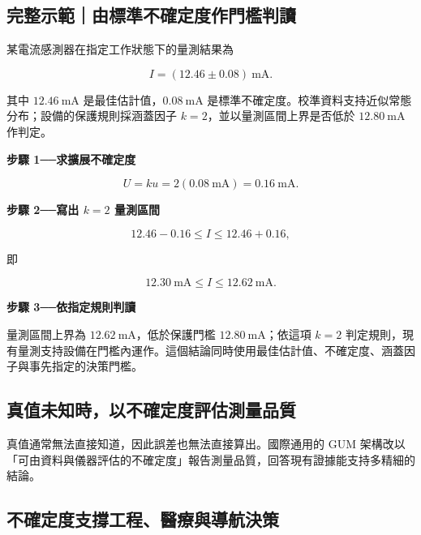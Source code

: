 \documentclass[11pt,a4paper]{article}
\begin{document}
\begin{HandoutWorkedExample}

\subsection{完整示範｜由標準不確定度作門檻判讀}\label{ux5b8cux6574ux793aux7bc4ux7531ux6a19ux6e96ux4e0dux78baux5b9aux5ea6ux4f5cux9580ux6abbux5224ux8b80}

某電流感測器在指定工作狀態下的量測結果為

\[
I=(12.46\pm0.08)\ \mathrm{mA}.
\]

其中 \(12.46\ \mathrm{mA}\) 是最佳估計值，\(0.08\ \mathrm{mA}\) 是標準不確定度。校準資料支持近似常態分布；設備的保護規則採涵蓋因子 \(k=2\)，並以量測區間上界是否低於 \(12.80\ \mathrm{mA}\) 作判定。

\textbf{步驟 1──求擴展不確定度}

\[
U=k u=2(0.08\ \mathrm{mA})=0.16\ \mathrm{mA}.
\]

\textbf{步驟 2──寫出 \(k=2\) 量測區間}

\[
12.46-0.16\le I\le12.46+0.16,
\]

即

\[
12.30\ \mathrm{mA}\le I\le12.62\ \mathrm{mA}.
\]

\textbf{步驟 3──依指定規則判讀}

量測區間上界為 \(12.62\ \mathrm{mA}\)，低於保護門檻 \(12.80\ \mathrm{mA}\)；依這項 \(k=2\) 判定規則，現有量測支持設備在門檻內運作。這個結論同時使用最佳估計值、不確定度、涵蓋因子與事先指定的決策門檻。

\end{HandoutWorkedExample}

\subsection{真值未知時，以不確定度評估測量品質}\label{ux771fux503cux672aux77e5ux6642ux4ee5ux4e0dux78baux5b9aux5ea6ux8a55ux4f30ux6e2cux91cfux54c1ux8cea}

真值通常無法直接知道，因此誤差也無法直接算出。國際通用的 GUM 架構改以「可由資料與儀器評估的不確定度」報告測量品質，回答現有證據能支持多精細的結論。

\subsection{不確定度支撐工程、醫療與導航決策}\label{ux4e0dux78baux5b9aux5ea6ux652fux6490ux5de5ux7a0bux91abux7642ux8207ux5c0eux822aux6c7aux7b56}
\end{document}
